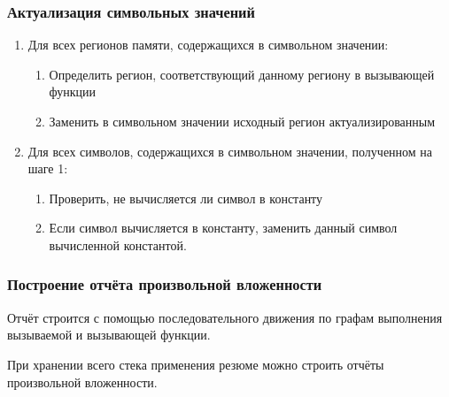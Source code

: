 \documentclass[hyperref={pdfpagelabels=false},10pt,gray]{beamer}
\begin{document}

\begin{frame}
\frametitle{Актуализация символьных значений}

\begin{enumerate}
 \item Для всех регионов памяти, содержащихся в символьном значении:
 \begin{enumerate}
  \item Определить регион, соответствующий данному региону в вызывающей функции
  \item Заменить в символьном значении исходный регион актуализированным
 \end{enumerate}
 \item Для всех символов, содержащихся в символьном значении, полученном на шаге 1:
  \begin{enumerate}
  \item Проверить, не вычисляется ли символ в константу
  \item Если символ вычисляется в константу, заменить данный символ вычисленной константой.
 \end{enumerate}

\end{enumerate}
\end{frame}


\begin{frame}
\frametitle{Построение отчёта произвольной вложенности}
Отчёт строится с помощью последовательного движения по графам выполнения вызываемой и вызывающей функции.

При хранении всего стека применения резюме можно строить отчёты произвольной вложенности.
\begin{figure}[h]
\end{figure}
\end{frame}
\end{document}
